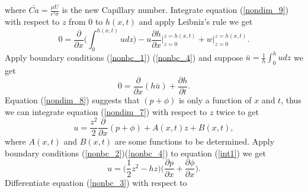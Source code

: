 \documentclass[]{article}
\begin{document}
where $\bar{Ca} = \frac{\mu U}{\epsilon^3 \sigma}$ is the new Capillary number. Integrate equation (\ref{nondim_9}) with respect to $z$ from $0$ to $h(x,t)$ and apply Leibniz's rule we get
\begin{equation}
	0 = \frac{\partial }{\partial x}\big( \int_0^{h(x,t)} u dz \big) - u \frac{\partial h}{\partial x}\rvert_{z=0}^{z=h(x,t)} + w\rvert_{z=0}^{z=h(x,t)}.
\end{equation}
Apply boundary conditions (\ref{nonbc_1}) (\ref{nonbc_4}) and suppose $\bar{u} = \frac{1}{h}\int_0^{h} u dz$ we get
\begin{equation}
	0 = \frac{\partial}{\partial x}(h\bar{u}) + \frac{\partial h}{\partial t}.
\end{equation}
Equation (\ref{nondim_8}) suggests that $(p+\phi)$ is only a function of $x$ and $t$, thus we can integrate equation (\ref{nondim_7}) with respect to $z$ twice to get
\begin{equation}
	\label{int1}
	u = \frac{z^2}{2}\frac{\partial}{\partial x}(p + \phi) + A(x,t)z + B(x,t),
\end{equation}
where $A(x,t)$ and $B(x,t)$ are some functions to be determined. Apply boundary conditions (\ref{nonbc_2})(\ref{nonbc_4}) to equation (\ref{int1}) we get
\begin{equation}
	\label{int2}
	u = \big( \frac{1}{2}z^2 - hz \big)\big( \frac{\partial p}{\partial x} + \frac{\partial \phi}{\partial x} \big).
\end{equation}
Differentiate equation (\ref{nonbc_3}) with respect to 
\end{document}

